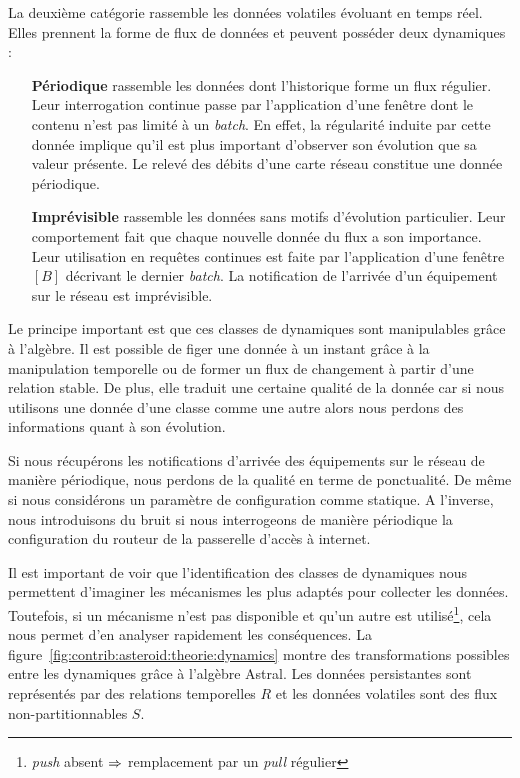 La deuxième catégorie rassemble les données volatiles évoluant en temps réel. Elles prennent la forme de flux de données et peuvent posséder deux dynamiques :
\begin{itemize}
	\item[\textbf{Périodique}] rassemble les données dont l'historique forme un flux régulier. Leur interrogation continue passe par l'application d'une fenêtre dont le contenu n'est pas limité à un \textit{batch}. En effet, la régularité induite par cette donnée implique qu'il est plus important d'observer son évolution que sa valeur présente. Le relevé des débits d'une carte réseau constitue une donnée périodique.
	\item[\textbf{Imprévisible}] rassemble les données sans motifs d'évolution particulier. Leur comportement fait que chaque nouvelle donnée du flux a son importance. Leur utilisation en requêtes continues est faite par l'application d'une fenêtre $[B]$ décrivant le dernier \textit{batch}. La notification de l'arrivée d'un équipement sur le réseau est imprévisible.
\end{itemize}

Le principe important est que ces classes de dynamiques sont manipulables grâce à l'algèbre. Il est possible de figer une donnée à un instant grâce à la manipulation temporelle ou de former un flux de changement à partir d'une relation stable. De plus, elle traduit une certaine qualité de la donnée car si nous utilisons une donnée d'une classe comme une autre alors nous perdons des informations quant à son évolution.
\begin{example}
	Si nous récupérons les notifications d'arrivée des équipements sur le réseau de manière périodique, nous perdons de la qualité en terme de ponctualité. De même si nous considérons un paramètre de configuration comme statique. A l'inverse, nous introduisons du bruit si nous interrogeons de manière périodique la configuration du routeur de la passerelle d'accès à internet.
\end{example}

Il est important de voir que l'identification des classes de dynamiques nous permettent d'imaginer les mécanismes les plus adaptés pour collecter les données. Toutefois, si un mécanisme n'est pas disponible et qu'un autre est utilisé\footnote{\textit{push} absent $\Rightarrow$ remplacement par un \textit{pull} régulier}, cela nous permet d'en analyser rapidement les conséquences. La figure~\ref{fig:contrib:asteroid:theorie:dynamics} montre des transformations possibles entre les dynamiques grâce à l'algèbre Astral. Les données persistantes sont représentés par des relations temporelles $R$ et les données volatiles sont des flux non-partitionnables $S$.

